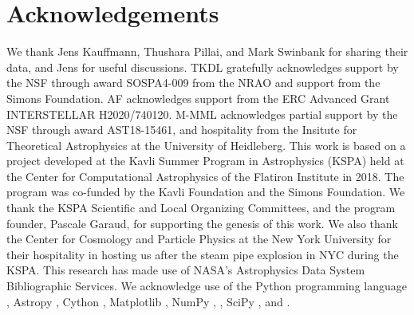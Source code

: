 \IfFileExists{emulateapjlegacy.cls}{\documentclass[iop]{emulateapjlegacy}}{\documentclass[iop]{emulateapj}}
\begin{document}
\section*{Acknowledgements}
We thank Jens Kauffmann, Thushara Pillai, and Mark Swinbank for sharing their data, and Jens for useful discussions.
%
TKDL gratefully acknowledges support by the NSF through award SOSPA4-009 from the NRAO and support from the Simons Foundation.
%
AF acknowledges support from the ERC Advanced Grant INTERSTELLAR
H2020/740120.
M-MML acknowledges partial support by the NSF through award
AST18-15461, and hospitality from the Insitute for Theoretical
Astrophysics at the University of Heidleberg.
%
This work is based on a project developed at the Kavli Summer Program in Astrophysics (KSPA) held at the Center for Computational Astrophysics of the Flatiron Institute in 2018. The program was co-funded by the Kavli Foundation and the Simons Foundation.
%
We thank the KSPA Scientific and Local Organizing Committees, and the program founder, Pascale Garaud, for supporting the genesis of this work.
%
We also thank the Center for Cosmology and Particle Physics at the New York University for their hospitality in hosting us after the steam pipe explosion in NYC during the KSPA.
%
This research has made use of NASA's Astrophysics Data System Bibliographic Services.
%
We acknowledge use of the Python programming language \citep{VanRossum1991}, Astropy \citep{astropy}, Cython \citep{behnel2010cython}, Matplotlib \citep{Hunter2007}, NumPy \citep{VanDerWalt2011},  \citep{Labadens2012}, SciPy \citep{scipyref}, and  \citep{Smith09a,Turk11a}.
%



\end{document}
